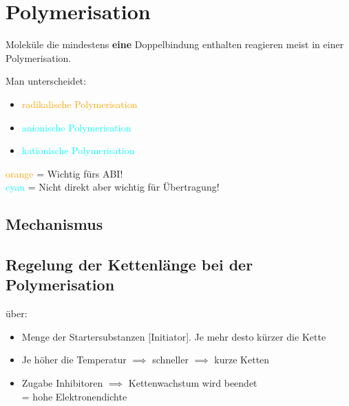 \section{Polymerisation}
Moleküle die mindestens \textbf{eine} Doppelbindung enthalten reagieren meist in einer Polymerisation.

Man unterscheidet: 
\begin{itemize}
    \item \textcolor{orange}{radikalische Polymerisation}
    \item \textcolor{cyan}{anionische Polymerisation}
    \item \textcolor{cyan}{kationische Polymerisation}
\end{itemize}

\textcolor{orange}{orange} = Wichtig fürs ABI! \\
\textcolor{cyan}{cyan} = Nicht direkt aber wichtig für Übertragung!

\subsection{Mechanismus}
\subsection{Regelung der Kettenlänge bei der Polymerisation}
über: 
\begin{itemize}
    \item Menge der Startersubstanzen [Initiator]. Je mehr desto kürzer die Kette
    \item Je höher die Temperatur $\implies$ schneller $\implies$ kurze Ketten
    \item Zugabe Inhibitoren $\implies$ Kettenwachstum wird beendet \\
        = hohe Elektronendichte
\end{itemize}

